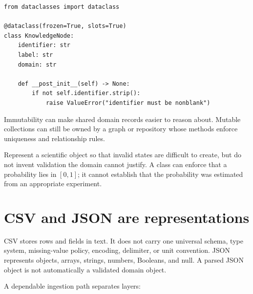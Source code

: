 \begin{lstlisting}
from dataclasses import dataclass

@dataclass(frozen=True, slots=True)
class KnowledgeNode:
    identifier: str
    label: str
    domain: str

    def __post_init__(self) -> None:
        if not self.identifier.strip():
            raise ValueError("identifier must be nonblank")
\end{lstlisting}

Immutability can make shared domain records easier to reason about. Mutable
collections can still be owned by a graph or repository whose methods enforce
uniqueness and relationship rules.

\begin{professionalbox}
Represent a scientific object so that invalid states are difficult to create,
but do not invent validation the domain cannot justify. A class can enforce that
a probability lies in $[0,1]$; it cannot establish that the probability was
estimated from an appropriate experiment.
\end{professionalbox}

\section{CSV and JSON are representations}

CSV stores rows and fields in text. It does not carry one universal schema,
type system, missing-value policy, encoding, delimiter, or unit convention.
JSON represents objects, arrays, strings, numbers, Booleans, and null. A parsed
JSON object is not automatically a validated domain object.

A dependable ingestion path separates layers:

\begin{center}
\end{center}

